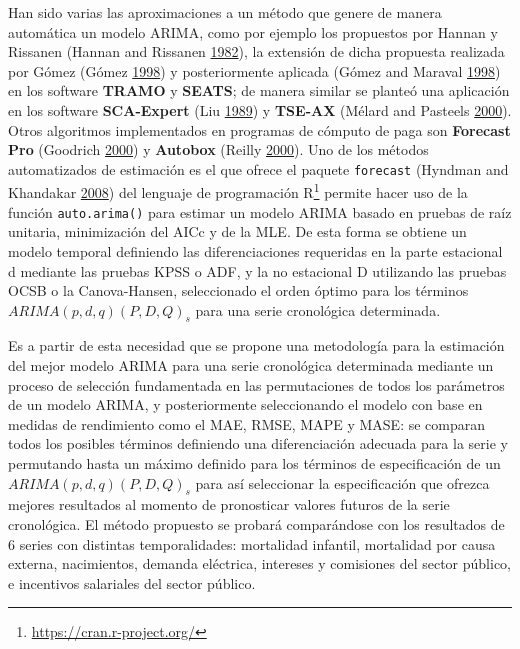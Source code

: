 \documentclass[]{article}
\let\rmarkdownfootnote\footnote%
\def\footnote{\protect\rmarkdownfootnote}
\begin{document}
Han sido varias las aproximaciones a un método que genere de manera
automática un modelo ARIMA, como por ejemplo los propuestos por Hannan y
Rissanen (Hannan and Rissanen \protect\hyperlink{ref-hannan}{1982}), la
extensión de dicha propuesta realizada por Gómez (Gómez
\protect\hyperlink{ref-gomez}{1998}) y posteriormente aplicada (Gómez
and Maraval \protect\hyperlink{ref-tramo}{1998}) en los software
\textbf{TRAMO} y \textbf{SEATS}; de manera similar se planteó una
aplicación en los software \textbf{SCA-Expert} (Liu
\protect\hyperlink{ref-liu}{1989}) y \textbf{TSE-AX} (Mélard and
Pasteels \protect\hyperlink{ref-melard}{2000}). Otros algoritmos
implementados en programas de cómputo de paga son \textbf{Forecast Pro}
(Goodrich \protect\hyperlink{ref-forecastpro}{2000}) y \textbf{Autobox}
(Reilly \protect\hyperlink{ref-autobox}{2000}). Uno de los métodos
automatizados de estimación es el que ofrece el paquete
\texttt{forecast} (Hyndman and Khandakar
\protect\hyperlink{ref-auto.arima}{2008}) del lenguaje de programación
R\footnote{\url{https://cran.r-project.org/}} permite hacer uso de la
función \texttt{auto.arima()} para estimar un modelo ARIMA basado en
pruebas de raíz unitaria, minimización del AICc y de la MLE. De esta
forma se obtiene un modelo temporal definiendo las diferenciaciones
requeridas en la parte estacional d mediante las pruebas KPSS o ADF, y
la no estacional D utilizando las pruebas OCSB o la Canova-Hansen,
seleccionado el orden óptimo para los términos \(ARIMA(p,d,q)(P,D,Q)_s\)
para una serie cronológica determinada.

Es a partir de esta necesidad que se propone una metodología para la
estimación del mejor modelo ARIMA para una serie cronológica determinada
mediante un proceso de selección fundamentada en las permutaciones de
todos los parámetros de un modelo ARIMA, y posteriormente seleccionando
el modelo con base en medidas de rendimiento como el MAE, RMSE, MAPE y
MASE: se comparan todos los posibles términos definiendo una
diferenciación adecuada para la serie y permutando hasta un máximo
definido para los términos de especificación de un
\(ARIMA(p,d,q)(P,D,Q)_s\) para así seleccionar la especificación que
ofrezca mejores resultados al momento de pronosticar valores futuros de
la serie cronológica. El método propuesto se probará comparándose con
los resultados de 6 series con distintas temporalidades: mortalidad
infantil, mortalidad por causa externa, nacimientos, demanda eléctrica,
intereses y comisiones del sector público, e incentivos salariales del
sector público.
\end{document}

